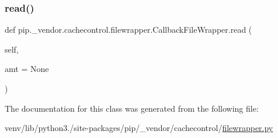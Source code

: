\subsubsection{\texorpdfstring{read()}{read()}}
{\footnotesize\ttfamily def pip.\+\_\+vendor.\+cachecontrol.\+filewrapper.\+Callback\+File\+Wrapper.\+read (\begin{DoxyParamCaption}\item[{}]{self,  }\item[{}]{amt = {\ttfamily None} }\end{DoxyParamCaption})}



The documentation for this class was generated from the following file\+:\begin{DoxyCompactItemize}
\item 
venv/lib/python3./site-\/packages/pip/\+\_\+vendor/cachecontrol/\hyperlink{filewrapper_8py}{filewrapper.\+py}\end{DoxyCompactItemize}
